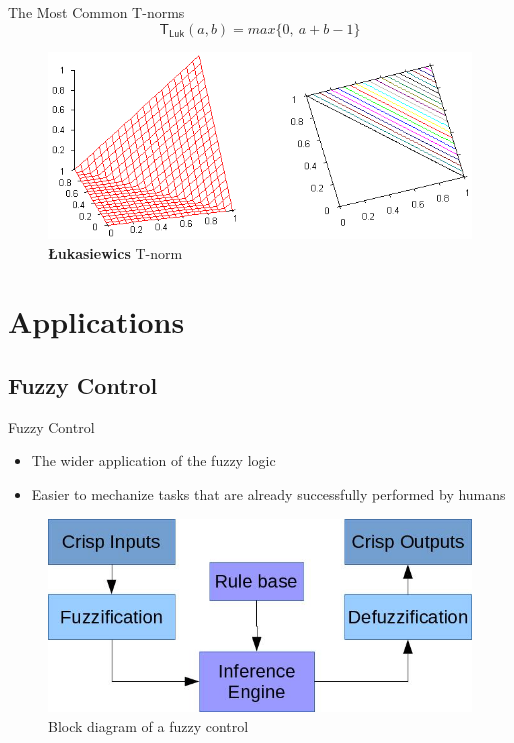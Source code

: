 \documentclass[hyperref={unicode}]{beamer}
\begin{document}
\begin{frame}{The Most Common T-norms}
	$$\mathsf{T_{Luk}}(a,b)=max\{0,\:a+b-1\}$$
	\begin{figure}
	\includegraphics[width=.95\textwidth]{luk-tnorm.png}		
	\caption{\textbf{{\L}ukasiewics} T-norm}
	\end{figure}
\end{frame}


\section{Applications}


\subsection{Fuzzy Control}

\begin{frame}{Fuzzy Control}
	\begin{itemize}
	\item The wider application of the fuzzy logic \cite{lughofer2011evolving}
	\item Easier to mechanize tasks that are already successfully performed by humans
	\end{itemize}

	\begin{figure}
	\includegraphics[width=.75\textwidth]{fuzzy-control-block.jpg}
	\caption{Block diagram of a fuzzy control}
	\end{figure}
\end{frame}
\end{document}

